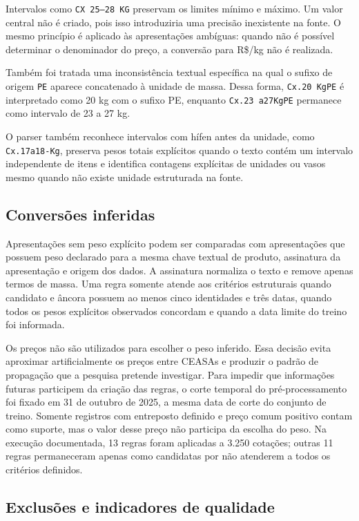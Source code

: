 \documentclass[12pt,a4paper]{article}
\begin{document}
Intervalos como \texttt{CX 25--28 KG} preservam os limites mínimo e máximo. Um
valor central não é criado, pois isso introduziria uma precisão inexistente na
fonte. O mesmo princípio é aplicado às apresentações ambíguas: quando não é
possível determinar o denominador do preço, a conversão para R\$/kg não é
realizada.

Também foi tratada uma inconsistência textual específica na qual o sufixo de
origem \texttt{PE} aparece concatenado à unidade de massa. Dessa forma,
\texttt{Cx.20 KgPE} é interpretado como 20 kg com o sufixo PE, enquanto
\texttt{Cx.23 a27KgPE} permanece como intervalo de 23 a 27 kg.

O parser também reconhece intervalos com hífen antes da unidade, como
\texttt{Cx.17a18-Kg}, preserva pesos totais explícitos quando o texto contém
um intervalo independente de itens e identifica contagens explícitas de
unidades ou vasos mesmo quando não existe unidade estruturada na fonte.

\subsection{Conversões inferidas}

Apresentações sem peso explícito podem ser comparadas com apresentações que
possuem peso declarado para a mesma chave textual de produto, assinatura da
apresentação e origem dos dados. A assinatura normaliza o texto e remove apenas
termos de massa. Uma regra somente atende aos critérios estruturais quando
candidato e âncora possuem ao menos cinco identidades e três datas, quando
todos os pesos explícitos observados concordam e quando a data limite do treino
foi informada.

Os preços não são utilizados para escolher o peso inferido. Essa decisão evita
aproximar artificialmente os preços entre CEASAs e produzir o padrão de
propagação que a pesquisa pretende investigar. Para impedir que informações
futuras participem da criação das regras, o corte temporal do pré-processamento
foi fixado em 31 de outubro de 2025, a mesma data de corte do conjunto de treino.
Somente registros com entreposto definido e preço comum positivo contam como
suporte, mas o valor desse preço não participa da escolha do peso.
Na execução documentada, 13 regras foram aplicadas a 3.250 cotações; outras 11 regras
permaneceram apenas como candidatas por não atenderem a todos os critérios
definidos.

\subsection{Exclusões e indicadores de qualidade}
\end{document}
